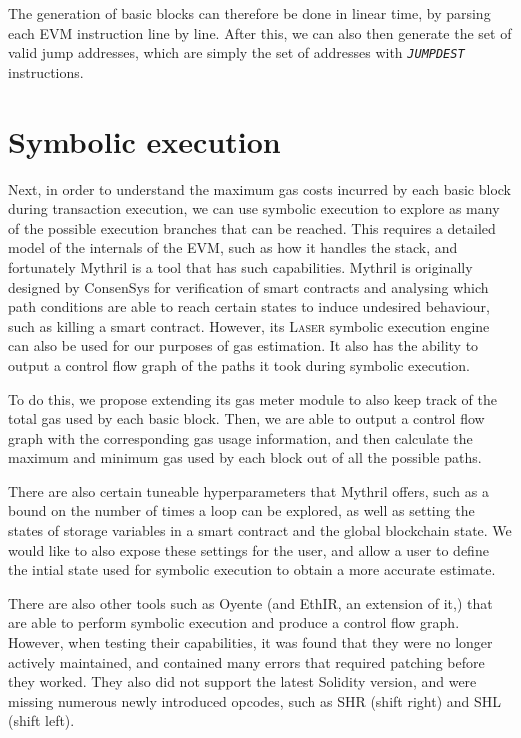 The generation of basic blocks can therefore be done in linear time, by parsing each
EVM instruction line by line. After this, we can also then generate the set of valid jump addresses,
which are simply the set of addresses with \textit{\texttt{JUMPDEST}} instructions.

\section{Symbolic execution}

Next, in order to understand the maximum gas costs incurred by each basic block during transaction
execution, we can use symbolic execution to explore as many of the possible execution branches that
can be reached. This requires a detailed model of the internals of the EVM, such as how it
handles the stack, and fortunately Mythril is a tool that has such capabilities. Mythril \cite{mythril} is originally
designed by ConsenSys for verification of smart contracts and analysing which path conditions are able to
reach certain states to induce undesired behaviour, such as killing a smart contract. However, its \textsc{Laser} symbolic
execution engine can also be used for our purposes of gas estimation. It also has the ability to output a control flow graph
of the paths it took during symbolic execution. 

To do this, we propose extending its gas meter module to also keep track of the total gas used by each basic block. Then,
we are able to output a control flow graph with the corresponding gas usage information, and then calculate the maximum 
and minimum gas used by each block out of all the possible paths.

There are also certain tuneable hyperparameters that Mythril offers, such as a bound on the number of times a loop can be explored,
as well as setting the states of storage variables in a smart contract and the global blockchain state. We would like to also expose
these settings for the user, and allow a user to define the intial state used for symbolic execution to obtain a more accurate
estimate.

There are also other tools such as Oyente \cite{oyente} (and EthIR, an extension of it,) that are able to perform symbolic execution and produce a 
control flow graph. However, when testing their capabilities, it was found that they were no longer actively maintained,
and contained many errors that required patching before they worked. They also did not support the latest Solidity version, and were
missing numerous newly introduced opcodes, such as SHR (shift right) and SHL (shift left).

